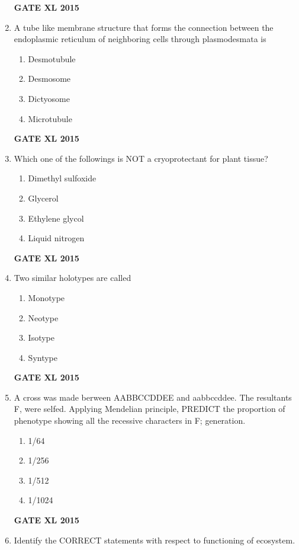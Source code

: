 \documentclass[journal,12pt,onecolumn]{IEEEtran}
\begin{document}
\begin{enumerate}
\begin{enumerate}
    \end{enumerate}
\begin{flushright}\textbf{GATE XL 2015}\end{flushright}
\item A tube like membrane structure that forms the connection between the endoplasmic reticulum of neighboring cells through plasmodesmata is
    \begin{enumerate}
            \item Desmotubule
	    \item Desmosome
	    \item Dictyosome
            \item Microtubule  
    \end{enumerate}
\begin{flushright}\textbf{GATE XL 2015}\end{flushright}
\item Which one of the followings is NOT a cryoprotectant for plant tissue?
    \begin{enumerate}
            \item Dimethyl sulfoxide
	    \item Glycerol
	    \item Ethylene glycol
            \item Liquid nitrogen
    \end{enumerate}
\begin{flushright}\textbf{GATE XL 2015}\end{flushright}
\item Two similar holotypes are called
    \begin{enumerate}
            \item Monotype
	    \item Neotype
	    \item Isotype
            \item Syntype
    \end{enumerate}
\begin{flushright}\textbf{GATE XL 2015}\end{flushright}
\item A cross was made berween AABBCCDDEE and aabbccddee. The resultants F, were selfed. Applying Mendelian principle, PREDICT the proportion of phenotype showing all the recessive characters in F; generation.
    \begin{enumerate}
            \item 1/64
	    \item 1/256
	    \item 1/512
            \item 1/1024
    \end{enumerate}
\begin{flushright}\textbf{GATE XL 2015}\end{flushright}
\item Identify the CORRECT statements with respect to functioning of ecosystem.


\end{enumerate}
\end{document}
